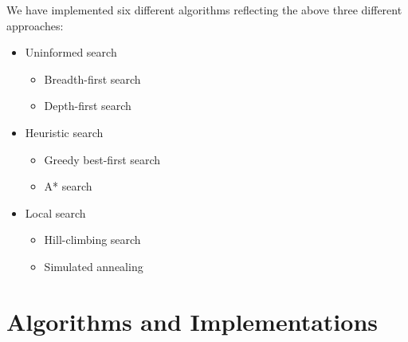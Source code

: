 \documentclass[a4paper]{article}
\begin{document}
We have implemented six different algorithms reflecting the above three different approaches: \\
\begin{itemize}
	\item Uninformed search
	\begin{itemize}
		\item Breadth-first search
		\item Depth-first search
	\end{itemize}

	\item Heuristic search
	\begin{itemize}
		\item Greedy best-first search
		\item A* search
	\end{itemize}

	\item Local search
	\begin{itemize}
		\item Hill-climbing search
		\item Simulated annealing
	\end{itemize}
\end{itemize}

 

\section{Algorithms and Implementations}
\end{document}
